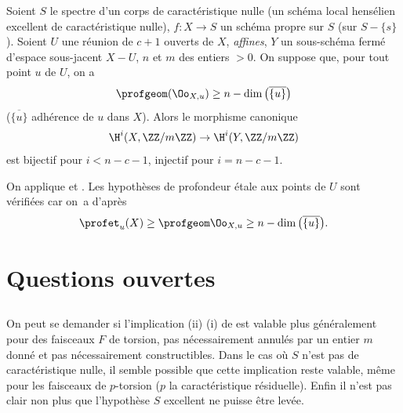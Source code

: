 \begin{corollaire} \label{XIV.5.7} Soient $S$ le spectre d'un corps de caract\'eristique nulle (\resp un sch\'ema local hens\'elien excellent de caract\'eristique nulle), $f\colon X\to S$ un sch\'ema propre sur $S$ (\resp sur $S-\{ s\}$). Soient $U$ une r\'eunion de $c+1$ ouverts de $X$, \emph{affines}, $Y$ un sous-sch\'ema ferm\'e d'espace sous-jacent $X-U$, $n$ et $m$ des entiers $>0$. On suppose que, pour tout point $u$ de $U$, on a
$$
\profgeom(\Oo_{X, u})\geq n-\dim\big(\overline{\{ u\} }\big)$$
($\overline{\{ u\} }$ adh\'erence de $u$ dans $X$). Alors le morphisme canonique
$$
\H^{i}(X, \ZZ/m\ZZ)\to\H^{i}(Y, \ZZ/m\ZZ)$$
est bijectif pour $i<n-c-1$, injectif pour $i=n-c-1$.
\end{corollaire}

On applique  et . Les hypoth\`eses de profondeur \'etale aux points de $U$ sont v\'erifi\'ees car on~a d'apr\`es  $$
\profet_{u}(X)\geq\profgeom\Oo_{X, u}\geq n-\dim\big(\overline{\{ u\} }\big).
$$

\enlargethispage{\baselineskip}%
\section{Questions ouvertes} \label{XIV.6}

\subsection{} \label{XIV.6.1} On peut se demander si l'implication \textup{(ii)} \ALORS \textup{(i)} de  est valable plus g\'en\'eralement pour des faisceaux $F$ de torsion, pas n\'ecessairement annul\'es par un entier $m$ donn\'e et pas n\'ecessairement constructibles\pageoriginale. Dans le cas o\`u $S$ n'est pas de caract\'eristique nulle, il semble possible que cette implication reste valable, m\^eme pour les faisceaux de $p$-torsion ($p$ la caract\'eristique r\'esiduelle). Enfin il n'est pas clair non plus que l'hypoth\`ese $S$ excellent ne puisse \^etre lev\'ee.

